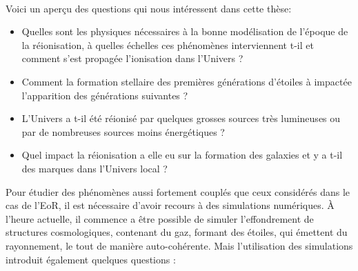 %


\paragraph{}
Voici un aperçu des questions qui nous intéressent dans cette thèse: 

\begin{itemize}
\item Quelles sont les physiques nécessaires à la bonne modélisation de l'époque de la réionisation, à quelles échelles ces phénomènes interviennent t-il et comment s'est propagée l'ionisation dans l'Univers ?
\item Comment la formation stellaire des premières générations d'étoiles à impactée l'apparition des générations suivantes ? %
\item L'Univers a t-il été réionisé par quelques grosses sources très lumineuses ou par de nombreuses sources moins énergétiques ?
\item Quel impact la réionisation a elle eu sur la formation des galaxies et y a t-il des marques dans l'Univers local ?
\end{itemize}

Pour étudier des phénomènes aussi fortement couplés que ceux considérés dans le cas de l'\ac{EoR}, il est nécessaire d'avoir recours à des simulations numériques. 
À l'heure actuelle, il commence a être possible de simuler l'effondrement de structures cosmologiques, contenant du gaz, formant des étoiles, qui émettent du rayonnement, le tout de manière auto-cohérente.
Mais l'utilisation des simulations introduit également quelques questions : 

